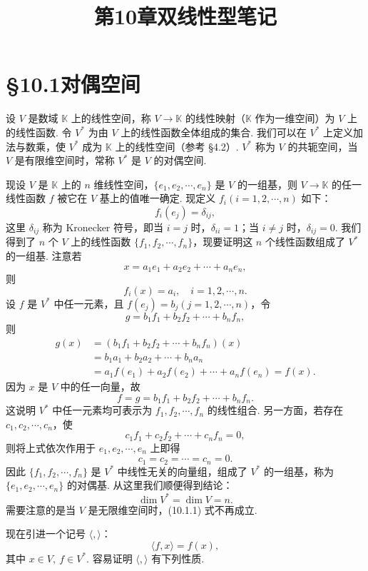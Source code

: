 \documentclass[UTF8,12pt,a4paper,fontset=fandol]{ctexart}
\title{第10章\quad 双线性型笔记}
\author{}
\date{}
\begin{document}
\maketitle

\section*{§10.1\quad 对偶空间}

设 $V$ 是数域 $\mathbb K$ 上的线性空间，称 $V\to \mathbb K$ 的线性映射（$\mathbb K$ 作为一维空间）为 $V$ 上的线性函数. 令 $V^*$ 为由 $V$ 上的线性函数全体组成的集合. 我们可以在 $V^*$ 上定义加法与数乘，使 $V^*$ 成为 $\mathbb K$ 上的线性空间（参考 §4.2）. $V^*$ 称为 $V$ 的共轭空间，当 $V$ 是有限维空间时，常称 $V^*$ 是 $V$ 的对偶空间.

现设 $V$ 是 $\mathbb K$ 上的 $n$ 维线性空间，$\{e_1,e_2,\cdots,e_n\}$ 是 $V$ 的一组基，则 $V\to \mathbb K$ 的任一线性函数 $f$ 被它在 $V$ 基上的值唯一确定. 现定义 $f_i(i=1,2,\cdots,n)$ 如下：
\[
  f_i(e_j)=\delta_{ij},
\]
这里 $\delta_{ij}$ 称为 Kronecker 符号，即当 $i=j$ 时，$\delta_{ii}=1$；当 $i\ne j$ 时，$\delta_{ij}=0$. 我们得到了 $n$ 个 $V$ 上的线性函数 $\{f_1,f_2,\cdots,f_n\}$，现要证明这 $n$ 个线性函数组成了 $V^*$ 的一组基. 注意若
\[
  x=a_1e_1+a_2e_2+\cdots+a_ne_n,
\]
则
\[
  f_i(x)=a_i,\quad i=1,2,\cdots,n.
\]
设 $f$ 是 $V^*$ 中任一元素，且 $f(e_j)=b_j(j=1,2,\cdots,n)$，令
\[
  g=b_1f_1+b_2f_2+\cdots+b_nf_n,
\]
则
\[
\begin{aligned}
  g(x)&=(b_1f_1+b_2f_2+\cdots+b_nf_n)(x)\\
      &=b_1a_1+b_2a_2+\cdots+b_na_n\\
      &=a_1f(e_1)+a_2f(e_2)+\cdots+a_nf(e_n)=f(x).
\end{aligned}
\]
因为 $x$ 是 $V$ 中的任一向量，故
\[
  f=g=b_1f_1+b_2f_2+\cdots+b_nf_n.
\]
这说明 $V^*$ 中任一元素均可表示为 $f_1,f_2,\cdots,f_n$ 的线性组合. 另一方面，若存在 $c_1,c_2,\cdots,c_n$，使
\[
  c_1f_1+c_2f_2+\cdots+c_nf_n=0,
\]
则将上式依次作用于 $e_1,e_2,\cdots,e_n$ 上即得
\[
  c_1=c_2=\cdots=c_n=0.
\]
因此 $\{f_1,f_2,\cdots,f_n\}$ 是 $V^*$ 中线性无关的向量组，组成了 $V^*$ 的一组基，称为 $\{e_1,e_2,\cdots,e_n\}$ 的对偶基. 从这里我们顺便得到结论：
\begin{equation}
  \dim V^*=\dim V=n.
  \tag{10.1.1}
\end{equation}
需要注意的是当 $V$ 是无限维空间时，(10.1.1) 式不再成立.

现在引进一个记号 $\langle,\rangle$：
\[
  \langle f,x\rangle=f(x),
\]
其中 $x\in V,\ f\in V^*$. 容易证明 $\langle,\rangle$ 有下列性质.
\end{document}
